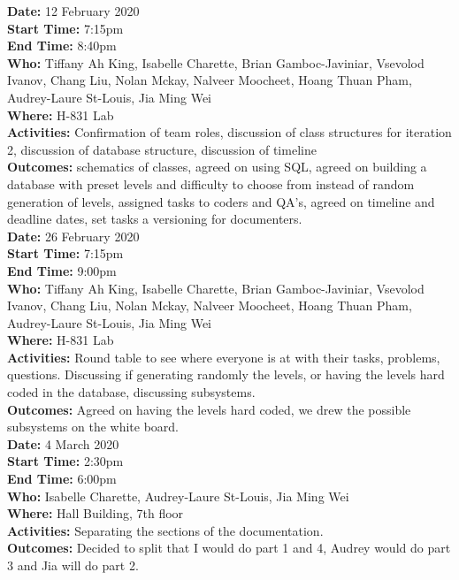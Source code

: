 \documentclass[12pt]{article}
\begin{document}
{\bf Date:} 12 February 2020\\
{\bf Start Time:} 7:15pm\\
{\bf End Time:} 8:40pm\\
{\bf Who:} Tiffany Ah King, Isabelle Charette, Brian Gamboc-Javiniar, Vsevolod Ivanov, Chang Liu, Nolan Mckay, Nalveer Moocheet, Hoang Thuan Pham, Audrey-Laure St-Louis, Jia Ming Wei\\
{\bf Where:} H-831 Lab \\
{\bf Activities:} Confirmation of team roles, discussion of class structures for iteration 2, discussion of database structure, discussion of timeline\\
{\bf Outcomes:} schematics of classes, agreed on using SQL, agreed on building a database with preset levels and difficulty to choose from instead of random generation of levels, assigned tasks to coders and QA's, agreed on timeline and deadline dates, set tasks a versioning for documenters.\\

{\bf Date:} 26 February 2020\\
{\bf Start Time:} 7:15pm\\
{\bf End Time:} 9:00pm\\
{\bf Who:} Tiffany Ah King, Isabelle Charette, Brian Gamboc-Javiniar, Vsevolod Ivanov, Chang Liu, Nolan Mckay, Nalveer Moocheet, Hoang Thuan Pham, Audrey-Laure St-Louis, Jia Ming Wei\\
{\bf Where:} H-831 Lab \\
{\bf Activities:} Round table to see where everyone is at with their tasks, problems, questions. Discussing if generating randomly the levels, or having the levels hard coded in the database, discussing subsystems.\\
{\bf Outcomes:} Agreed on having the levels hard coded, we drew the possible subsystems on the white board.\\

{\bf Date:} 4 March 2020\\
{\bf Start Time:} 2:30pm\\
{\bf End Time:} 6:00pm\\
{\bf Who:} Isabelle Charette, Audrey-Laure St-Louis, Jia Ming Wei\\
{\bf Where:} Hall Building, 7th floor \\
{\bf Activities:} Separating the sections of the documentation.\\
{\bf Outcomes:} Decided to split that I would do part 1 and 4, Audrey would do part 3 and Jia will do part 2.\\
\end{document}
